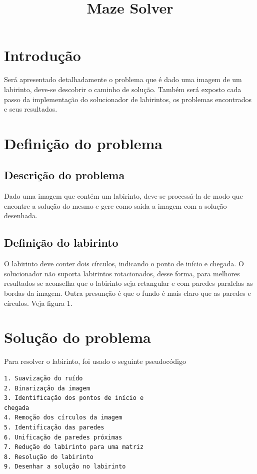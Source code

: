 \documentclass[conference]{IEEEtran}
\begin{document}
\title{Maze Solver
}

\author{
}

\maketitle

\section{Introdução}
Será apresentado detalhadamente o problema que é dado uma imagem de um labirinto, deve-se descobrir o caminho de solução. Também será exposto cada passo da implementação do solucionador de labirintos, os problemas encontrados e seus resultados.

\section{Definição do problema}

\subsection{Descrição do problema}
Dado uma imagem que contém um labirinto, deve-se processá-la de modo que encontre a solução do mesmo e gere como saída a imagem com a solução desenhada.
\subsection {Definição do labirinto}
O labirinto deve conter dois círculos, indicando o ponto de início e chegada. O solucionador não suporta labirintos rotacionados, desse forma, para melhores resultados se aconselha que o labirinto seja retangular e com paredes paralelas as bordas da imagem. Outra presunção é que o fundo é mais claro que as paredes e círculos. Veja figura 1.


\section{Solução do problema}
Para resolver o labirinto, foi usado o seguinte pseudocódigo
\begin{verbatim}
1. Suavização do ruído
2. Binarização da imagem
3. Identificação dos pontos de início e
chegada
4. Remoção dos círculos da imagem
5. Identificação das paredes
6. Unificação de paredes próximas
7. Redução do labirinto para uma matriz
8. Resolução do labirinto
9. Desenhar a solução no labirinto
\end{verbatim}
\end{document}
